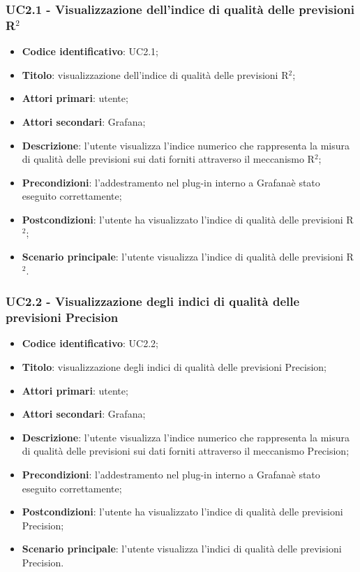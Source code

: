 \subsubsection{UC2.1 - Visualizzazione dell'indice di qualità delle previsioni R$^{2}$}
\begin{itemize}
	\item \textbf{Codice identificativo}: UC2.1;
	\item \textbf{Titolo}: visualizzazione dell'indice di qualità delle previsioni R$^{2}$\glo;
	\item \textbf{Attori primari}: utente;
	\item \textbf{Attori secondari}: Grafana\glo;
	\item \textbf{Descrizione}: l'utente visualizza l'indice numerico che rappresenta la misura di qualità delle previsioni sui dati forniti attraverso il meccanismo R$^{2}$\glo;
	\item \textbf{Precondizioni}: l'addestramento nel plug-in interno a Grafana\glosp è stato eseguito correttamente;
	\item \textbf{Postcondizioni}: l'utente ha visualizzato l'indice di qualità delle previsioni R$^{2}$\glo;
	\item \textbf{Scenario principale}: l'utente visualizza l'indice di qualità delle previsioni R$^{2}$\glo.
\end{itemize} 
\subsubsection{UC2.2 - Visualizzazione degli indici di qualità delle previsioni Precision}
\begin{itemize}
	\item \textbf{Codice identificativo}: UC2.2;
	\item \textbf{Titolo}: visualizzazione degli indici di qualità delle previsioni Precision\glo;
	\item \textbf{Attori primari}: utente;
	\item \textbf{Attori secondari}: Grafana\glo;
	\item \textbf{Descrizione}: l'utente visualizza l'indice numerico che rappresenta la misura di qualità delle previsioni sui dati forniti attraverso il meccanismo Precision\glo;
	\item \textbf{Precondizioni}: l'addestramento nel plug-in interno a Grafana\glosp è stato eseguito correttamente;
	\item \textbf{Postcondizioni}: l'utente ha visualizzato l'indice di qualità delle previsioni Precision\glo;
	\item \textbf{Scenario principale}: l'utente visualizza l'indici di qualità delle previsioni Precision\glo.
\end{itemize} 
